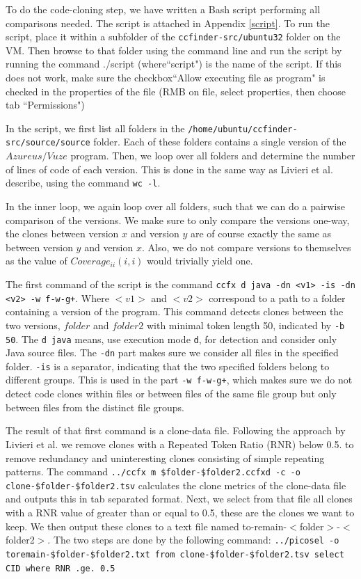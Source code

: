 \documentclass[a4paper,twoside, twocolumn, 11pt]{article}
\numberwithin{equation}{section}
\begin{document}
To do the code-cloning step, we have written a Bash script performing all comparisons needed.
The script is attached in Appendix \ref{script}.
To run the script, place it within a subfolder of the \texttt{ccfinder-src/ubuntu32} folder on the VM. 
Then browse to that folder using the command line and run the script by running the command ./script (where``script") is the name of the script.
If this does not work, make sure the checkbox``Allow executing file as program" is checked in the properties of the file (RMB on file, select properties, then choose tab ``Permissions")

In the script, we first list all folders in the \texttt{/home/ubuntu/ccfinder-src/source/source} folder.
Each of these folders contains a single version of the $Azureus/Vuze$ program.
Then, we loop over all folders and determine the number of lines of code of each version.
This is done in the same way as Livieri et al. describe, using the command \texttt{wc -l}.

In the inner loop, we again loop over all folders, such that we can do a pairwise comparison of the versions.
We make sure to only compare the versions one-way, the clones between version $x$ and version $y$ are of course exactly the same as between version $y$ and version $x$.
Also, we do not compare versions to themselves as the value of $Coverage_{ii}(i,i)$ would trivially yield one.

The first command of the script is the command \texttt{ccfx d java -dn <v1> -is -dn <v2> -w f-w-g+}. 
Where $<v1>$ and $<v2>$ correspond to a path to a folder containing a version of the program.
This command detects clones between the two versions, $folder$ and $folder2$ with minimal token length 50, indicated by \texttt{-b 50}.
The \texttt{d java} means, use execution mode \texttt{d}, for detection and consider only Java source files.
The \texttt{-dn} part makes sure we consider all files in the specified folder.
\texttt{-is} is a separator, indicating that the two specified folders belong to different groups. 
This is used in the part \texttt{-w f-w-g+}, which makes sure we do not detect code clones within files or between files of the same file group but only between files from the distinct file groups.

The result of that first command is a clone-data file. 
Following the approach by Livieri et al. we remove clones with a Repeated Token Ratio (RNR) below 0.5. to remove redundancy and uninteresting clones consisting of simple repeating patterns. 
The command \texttt{../ccfx m \$folder-\$folder2.ccfxd -c -o clone-\$folder-\$folder2.tsv} calculates the clone metrics of the clone-data file and outputs this in tab separated format. 
Next, we select from that file all clones with a RNR value of greater than or equal to 0.5, these are the clones we want to keep. 
We then output these clones to a text file named to-remain-$<$folder$>$-$<$folder2$>$. 
The two steps are done by the following command: \texttt{../picosel -o toremain-\$folder-\$folder2.txt from clone-\$folder-\$folder2.tsv select CID where RNR .ge. 0.5}
\end{document}

